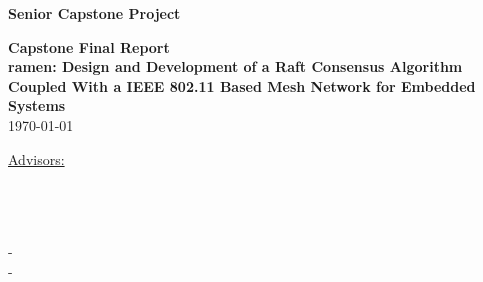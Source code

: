 \begin{titlepage}

 \begin{center}
 \textbf{\large Senior Capstone Project}
       \vspace*{\fill}

        \textbf {Capstone Final Report\\}
        \textbf {\large ramen: Design and Development of a Raft Consensus Algorithm \\Coupled With a IEEE 802.11 Based Mesh Network for Embedded Systems\\}
        \today
      
        \vfill
            
     \underline {Advisors:}\\
       \advisorOneName\\
       \advisorTwoName\\
       
            
       \vspace{0.8cm}
     
            
       \underline {\group}\\
       \studentOneName - \studentOneEmail\\
       \studentTwoName - \studentTwoEmail\\
      
            
   \end{center}
\end{titlepage}